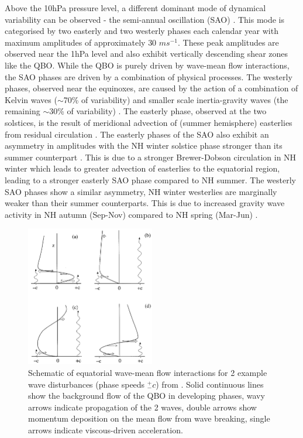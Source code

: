 Above the 10hPa pressure level, a different dominant mode of dynamical variability can be observed - the semi-annual oscillation (SAO) \citep{Baldwin2001}. This mode is categorised by two easterly and two westerly phases each calendar year with maximum amplitudes of approximately 30 $ms^{-1}$. These peak amplitudes are observed near the 1hPa level and also exhibit vertically descending shear zones like the QBO. While the QBO is purely driven by wave-mean flow interactions, the SAO phases are driven by a combination of physical processes. The westerly phases, observed near the equinoxes, are caused by the action of a combination of Kelvin waves ($\sim$70\% of variability) and smaller scale inertia-gravity waves (the remaining $\sim$30\% of variability) \citep{Dunkerton1982,Hitchman1988}. The easterly phase, observed at the two solstices, is the result of meridional advection of (summer hemisphere) easterlies from residual circulation \citep{HoltonWerb1980,MahlmanJ.D.1980}. The easterly phases of the SAO also exhibit an asymmetry in amplitudes with the NH winter solstice phase stronger than its summer counterpart \citep{Dunkerton1982}. This is due to a stronger Brewer-Dobson circulation in NH winter which leads to greater advection of easterlies to the equatorial region, leading to a stronger easterly SAO phase compared to NH summer. The westerly SAO phases show a similar asymmetry, NH winter westerlies are marginally weaker than their summer counterparts. This is due to increased gravity wave activity in NH autumn (Sep-Nov) compared to NH spring (Mar-Jun) \citep{Ray98}. 

\begin{figure}[h!]
\centering
    \includegraphics[width=0.5\textwidth]{Figures/Figures-background/Schematic_of_QBO_waves.png}
    \caption[Schematic of equatorial wave-mean flow interactions.]{Schematic of equatorial wave-mean flow interactions for 2 example wave disturbances (phase speeds $^+_- c$) from \cite{plumbQuasibiennial1984}. Solid continuous lines show the background flow of the QBO in developing phases, wavy arrows indicate propagation of the 2 waves, double arrows show momentum deposition on the mean flow from wave breaking, single arrows indicate viscous-driven acceleration.}
    \label{fig:QBO_wave_schematic}
\centering
\end{figure}

